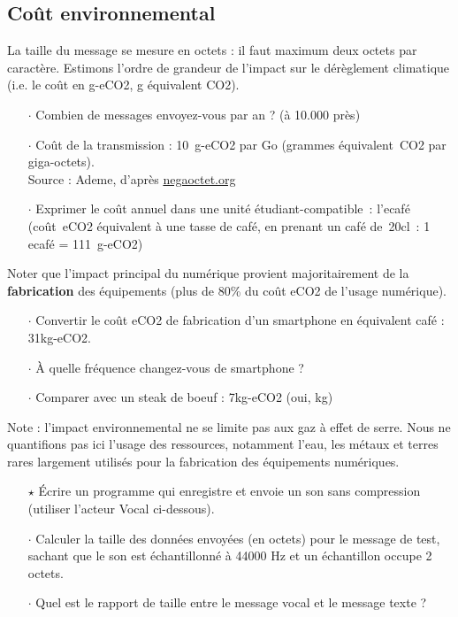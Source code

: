 

\subsection*{Coût environnemental}

La taille du message se mesure en octets : il faut maximum deux octets par caractère.
Estimons l'ordre de grandeur de l'impact sur le dérèglement climatique (i.e. le coût en g-eCO2, g équivalent CO2).

\begin{itemize}[itemsep=0.2ex]
\item[$\cdot$] Combien de messages envoyez-vous par an ? (à 10.000 près)
\item[$\cdot$] Coût de la transmission : 10~g-eCO2 par Go (grammes équivalent~CO2 par giga-octets).\\
  {\small Source : Ademe, d'après \url{negaoctet.org}}
\item[$\cdot$] Exprimer le coût annuel dans une unité étudiant-compatible~: l'ecafé (coût~eCO2 équivalent à une tasse de café, en prenant un café de~20cl~: 1 ecafé = 111~g-eCO2)
\end{itemize}

Noter que l'impact principal du numérique provient majoritairement de la \textbf{fabrication} des équipements (plus de 80\% du coût eCO2 de l'usage numérique).

\begin{itemize}[itemsep=0.2ex]
\item[$\cdot$] Convertir le coût eCO2 de fabrication d'un smartphone en équivalent café : 31kg-eCO2.
\item[$\cdot$] À quelle fréquence changez-vous de smartphone ?
\item[$\cdot$] Comparer avec un steak de boeuf : 7kg-eCO2 (oui, kg) {\footnotesize \color{gray}{(à quelle fréquence mangez-vous de la viande ?)}}
\end{itemize}

\medskip

Note : l'impact environnemental ne se limite pas aux gaz à effet de serre. Nous ne quantifions pas ici l'usage des ressources, notamment l'eau, les métaux et terres rares largement utilisés pour la fabrication des équipements numériques.


\begin{itemize}
\item[$\star$] Écrire un programme qui enregistre et envoie un son sans compression (utiliser l'acteur Vocal ci-dessous).
\item[$\cdot$] Calculer la taille des données envoyées (en octets) pour le message de test, sachant que le son est échantillonné à 44000 Hz et un échantillon occupe 2 octets.
\item[$\cdot$] Quel est le rapport de taille entre le message vocal et le message texte ?
\end{itemize}

